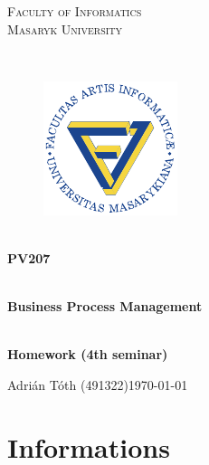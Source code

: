 \documentclass[11pt,a4paper]{article}
\begin{document}
\begin{titlepage}

    \begin{center}
        \vfill {%
            \Huge{%
                \textsc{%
                    Faculty of Informatics\\[3mm]%
                    Masaryk University%
                }%
            }%
        }%

        \hfill\\[15mm]

        \begin{figure}[!h]
            \centering
            \includegraphics[scale=3]{muni-fi-logo.pdf}
        \end{figure}

        \hfill\\[10mm]

        \Huge{
            \textbf{
                PV207
            }
        }

        \hfill\\[-10mm]

        \huge{
            \textbf{
                Business Process Management
            }
        }

        \hfill\\[10mm]

        \LARGE{
            \textbf{
                Homework (4th seminar)
            }
        }
        \vfill

    \end{center}

        \Large{
            \noindent Adrián Tóth (491322)\hfill \today
        }

\end{titlepage}

\setlength{\parskip}{0pt}
    {
        \hypersetup{
            hidelinks=true
        }
        \tableofcontents
    }
\setlength{\parskip}{0pt}

\newpage

\section{Informations}
\end{document}
